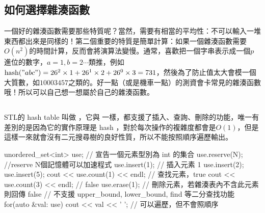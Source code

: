 \subsection{如何選擇雜湊函數}
一個好的雜湊函數需要那些特質呢？當然，需要有相當的平均性：不可以輸入一堆東西都出來是同樣的！第二個重要的特質是簡單計算：如果一個雜湊函數需要$O(n^2)$的時間計算，反而會將演算法變慢。通常，喜歡把一個字串表示成一個$p$進位的數字，$a = 1, b = 2\cdots$類推，例如$\text{hash}("abc") = 26^2 \times 1 + 26^1 \times 2 + 26^0 \times 3 = 731$，然後為了防止值太大會模一個大質數，如$10003457$之類的。好一點（或是機車一點）的測資會卡常見的雜湊函數哦！所以可以自己想一想屬於自己的雜湊函數。
\subsection{} 
STL的 hash table 叫做 ，它與  一樣，都支援了插入、查詢、刪除的功能，唯一有差別的是因為它的實作原理是 hash ，對於每次操作的複雜度都會是$O(1)$，但是這樣一來就會沒有二元搜尋樹的良好性質，所以不能按照順序遍歷輸出。
\begin{C++}
unordered_set<int> use; // 宣告一個元素型別為 int 的集合
use.reserve(N); //reserve N個記憶體可以加速程式
use.insert(1); // 插入元素 1
use.insert(2);
use.insert(5);
cout << use.count(1) << endl; // 查找元素，true
cout << use.count(3) << endl; // false
use.erase(1); // 刪除元素，若雜湊表內不含此元素則回傳 false
// 不支援 upper_bound, lower_bound, find 等二分查找功能
for(auto &val: use)
    cout << val << ' ';
// 可以遍歷，但不會照順序
\end{C++}
